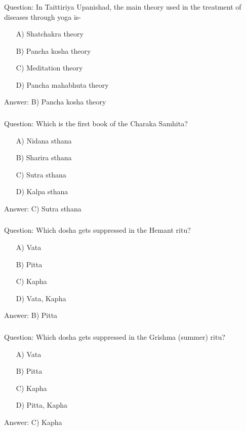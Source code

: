 \begin{frame}[fragile]\frametitle{}

Question: In Taittiriya Upanishad, the main theory used in the treatment of diseases through yoga is-

\begin{itemize}
\item[A)] Shatchakra theory
\item[B)] Pancha kosha theory
\item[C)] Meditation theory
\item[D)] Pancha mahabhuta theory
\end{itemize}

Answer: B) Pancha kosha theory
\end{frame}

\begin{frame}[fragile]\frametitle{}

Question: Which is the first book of the Charaka Samhita?

\begin{itemize}
\item[A)] Nidana sthana
\item[B)] Sharira sthana
\item[C)] Sutra sthana
\item[D)] Kalpa sthana
\end{itemize}

Answer: C) Sutra sthana
\end{frame}

\begin{frame}[fragile]\frametitle{}

Question: Which dosha gets suppressed in the Hemant ritu?

\begin{itemize}
\item[A)] Vata
\item[B)] Pitta
\item[C)] Kapha
\item[D)] Vata, Kapha
\end{itemize}

Answer: B) Pitta
\end{frame}

\begin{frame}[fragile]\frametitle{}

Question: Which dosha gets suppressed in the Grishma (summer) ritu?

\begin{itemize}
\item[A)] Vata
\item[B)] Pitta
\item[C)] Kapha
\item[D)] Pitta, Kapha
\end{itemize}

Answer: C) Kapha
\end{frame}

